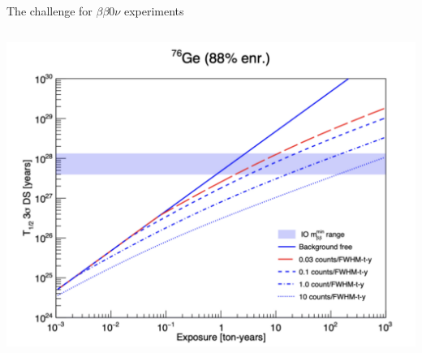 \documentclass [aspectratio=169]{beamer}
\begin{document}
\begin{frame}{The challenge for $\beta\beta0\nu$ experiments}
\begin{columns}
 \includegraphics[scale=0.29]{ gesensi.png}
%
%
%
\end{columns}
\end{frame}





%
%
%
%
%
%
\end{document}
